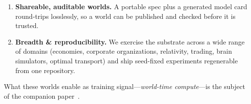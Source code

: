 \documentclass[11pt]{article}
\begin{document}
\begin{enumerate}
  synthesized dynamics are exact on \MultiCodeExact{} \RolloutSteps-step rollouts (95\% CI
  \MultiCodeCI) and answer $10\times$ out-of-distribution probes at \CodeOODRate; composition is
  verified compositionally and defeats the monolithic-synthesis complexity cliff; and the
  perceive$\to$world$\to$emit boundary adds zero dynamics error. Verification is itself measured:
  each gate's contribution is ablated ($+0.24$ probe accuracy over blind acceptance), and we are
  explicit that it certifies executable, invariant-respecting code, not rule-correctness
  (on a weak 3B generator the gate accepts every program yet none is branch-exact---a 100\%
  branch-level false-accept rate).
  \item \textbf{Shareable, auditable worlds.} A portable spec plus a generated model card
  round-trips losslessly, so a world can be published and checked before it is trusted.
  \item \textbf{Breadth \& reproducibility.} We exercise the substrate across a wide range of
  domains (economies, corporate organizations, relativity, trading, brain simulators, optimal
  transport) and ship \NumExperiments{} seed-fixed experiments regenerable from one repository.
\end{enumerate}
What these worlds enable as training signal---\emph{world-time compute}---is the subject
of the companion paper~\cite{openworld_wtc}.
\end{document}

